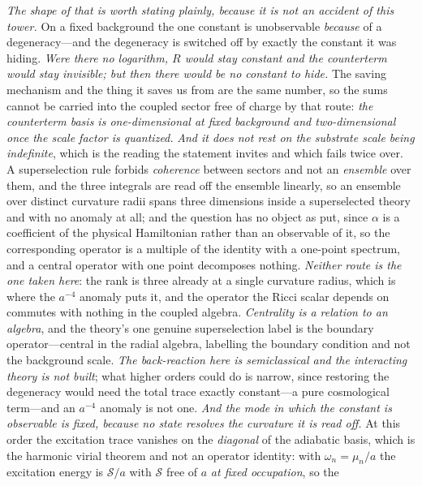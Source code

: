 \documentclass[11pt,a4paper]{article}
\theoremstyle{plain}
\theoremstyle{definition}
\theoremstyle{remark}
\begin{document}
\emph{The shape of that is worth stating plainly, because it is not an accident of this tower.} On a
fixed background the one constant is unobservable \emph{because} of a degeneracy---and the degeneracy is
switched off by exactly the constant it was hiding. \emph{Were there no logarithm, $R$ would stay
constant and the counterterm would stay invisible; but then there would be no constant to hide.} The
saving mechanism and the thing it saves us from are the same number, so the sums cannot be carried into
the coupled sector free of charge by that route: \emph{the counterterm basis is one-dimensional at fixed
background and two-dimensional once the scale factor is quantized.} \emph{And it does not rest on the substrate scale being indefinite}, which is the reading the statement
invites and which fails twice over. A superselection rule forbids \emph{coherence} between sectors and
not an \emph{ensemble} over them, and the three integrals are read off the ensemble linearly, so an
ensemble over distinct curvature radii spans three dimensions inside a superselected theory and with no
anomaly at all; and the question has no object as put, since $\alpha$ is a coefficient of the physical
Hamiltonian rather than an observable of it, so the corresponding operator is a multiple of the identity
with a one-point spectrum, and a central operator with one point decomposes nothing. \emph{Neither route
is the one taken here}: the rank is three already at a single curvature radius, which is where the
$a^{-4}$ anomaly puts it, and the operator the Ricci scalar depends on commutes with nothing in the
coupled algebra. \emph{Centrality is a relation to an algebra}, and the theory's one genuine
superselection label is the boundary operator---central in the radial algebra, labelling the boundary
condition and not the background
scale.
\emph{The back-reaction here is semiclassical and the interacting theory is
not built}; what higher orders could do is narrow, since restoring the degeneracy would need the total
trace exactly constant---a pure cosmological term---and an $a^{-4}$ anomaly is not one. \emph{And the mode in which the constant is observable is fixed, because no state resolves the curvature
it is read off.} At this order the excitation trace vanishes on the \emph{diagonal} of the adiabatic
basis, which is the harmonic virial theorem and not an operator identity: with $\omega_n=\mu_n/a$ the
excitation energy is $\mathcal S/a$ with $\mathcal S$ free of $a$ \emph{at fixed occupation}, so the
\end{document}
